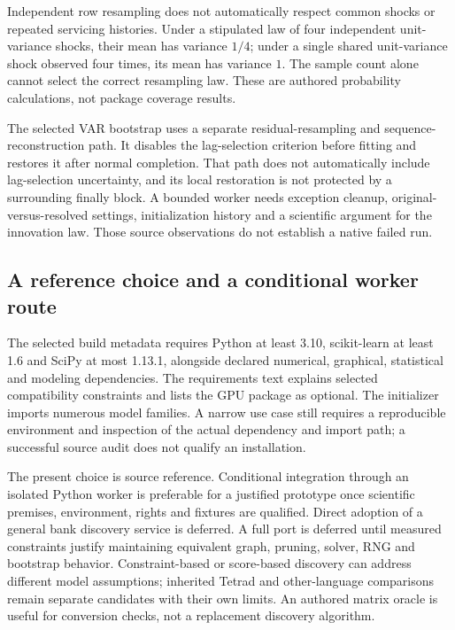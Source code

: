 Independent row resampling does not automatically respect common shocks
or repeated servicing histories. Under a stipulated law of four independent
unit-variance shocks, their mean has variance $1/4$; under a single shared
unit-variance shock observed four times, its mean has variance $1$.
The sample count alone cannot select the correct resampling law.
These are authored probability calculations, not package coverage results.
\citep{exec24_lingam_choice}

The selected VAR bootstrap uses a separate residual-resampling and
sequence-reconstruction path. It disables the lag-selection criterion
before fitting and restores it after normal completion. That path does
not automatically include lag-selection uncertainty, and its local
restoration is not protected by a surrounding finally block. A bounded
worker needs exception cleanup, original-versus-resolved settings,
initialization history and a scientific argument for the innovation law.
Those source observations do not establish a native failed run.
\citep{exec24_lingam_source}

\subsection{A reference choice and a conditional worker route}
The selected build metadata requires Python at least 3.10, scikit-learn
at least 1.6 and SciPy at most 1.13.1, alongside declared numerical,
graphical, statistical and modeling dependencies. The requirements text
explains selected compatibility constraints and lists the GPU package as
optional. The initializer imports numerous model families. A narrow use
case still requires a reproducible environment and inspection of the
actual dependency and import path; a successful source audit does not
qualify an installation.~\citep{exec24_lingam_source}

The present choice is source reference. Conditional integration through
an isolated Python worker is preferable for a justified prototype once
scientific premises, environment, rights and fixtures are qualified.
Direct adoption of a general bank discovery service is deferred. A full
port is deferred until measured constraints justify maintaining equivalent
graph, pruning, solver, RNG and bootstrap behavior. Constraint-based or
score-based discovery can address different model assumptions; inherited
Tetrad and other-language comparisons remain separate candidates with
their own limits. An authored matrix oracle is useful for conversion
checks, not a replacement discovery algorithm.
\citep{exec24_lingam_choice}

